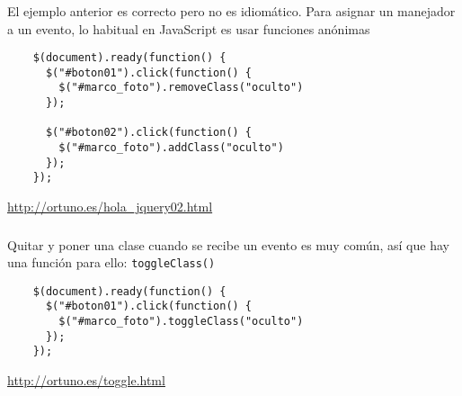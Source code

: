 \documentclass[ucs]{beamer}
\begin{document}
\begin{frame}[fragile]
\frametitle{}
El ejemplo anterior es correcto pero no es idiomático.
Para asignar un manejador a un evento, lo
 habitual en JavaScript es
usar funciones anónimas 

  \begin{scriptsize}
  \begin{verbatim}
    $(document).ready(function() {
      $("#boton01").click(function() {
        $("#marco_foto").removeClass("oculto")
      });

      $("#boton02").click(function() {
        $("#marco_foto").addClass("oculto")
      });
    });
  \end{verbatim}
  \end{scriptsize}

\begin{tiny}
\begin{flushright}
\url{http://ortuno.es/hola_jquery02.html}
\end{flushright}
\end{tiny}

\end{frame}




\begin{frame}[fragile]
\frametitle{}
Quitar y poner una clase cuando se recibe un evento es muy común, así que
hay una función para ello: \verb|toggleClass()|


  \begin{scriptsize}
  \begin{verbatim}
    $(document).ready(function() {
      $("#boton01").click(function() {
        $("#marco_foto").toggleClass("oculto")
      });
    });
  \end{verbatim}
  \end{scriptsize}

\begin{tiny}
\begin{flushright}
\url{http://ortuno.es/toggle.html}
\end{flushright}
\end{tiny}

\end{frame}
\end{document}
